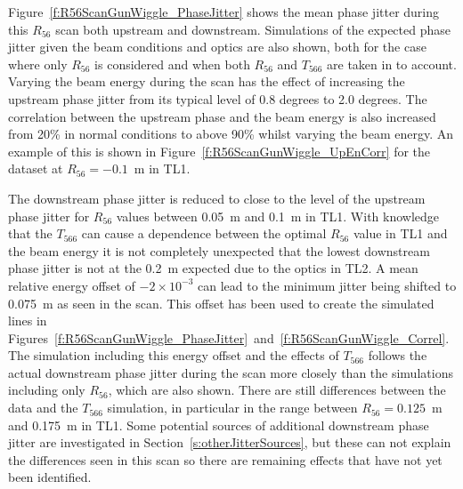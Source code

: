 Figure~\ref{f:R56ScanGunWiggle_PhaseJitter} shows the mean phase jitter during this \(R_{56}\) scan both upstream and downstream. Simulations of the expected phase jitter given the beam conditions and optics are also shown, both for the case where only \(R_{56}\) is considered and when both \(R_{56}\) and \(T_{566}\) are taken in to account. Varying the beam energy during the scan has the effect of increasing the upstream phase jitter from its typical level of 0.8 degrees to 2.0 degrees. The correlation between the upstream phase and the beam energy is also increased from 20\% in normal conditions to above 90\% whilst varying the beam energy. An example of this is shown in Figure~\ref{f:R56ScanGunWiggle_UpEnCorr} for the dataset at \(R_{56}=-0.1\)~m in TL1. %

The downstream phase jitter is reduced to close to the level of the upstream phase jitter for \(R_{56}\) values between 0.05~m and 0.1~m in TL1.  With knowledge that the \(T_{566}\) can cause a dependence between the optimal \(R_{56}\) value in TL1 and the beam energy it is not completely unexpected that the lowest downstream phase jitter is not at the 0.2~m expected due to the optics in TL2. A mean relative energy offset of \(-2\times10^{-3}\) can lead to the minimum jitter being shifted to 0.075~m as seen in the scan. This offset has been used to create the simulated lines  in Figures~\ref{f:R56ScanGunWiggle_PhaseJitter}~and~\ref{f:R56ScanGunWiggle_Correl}. The simulation including this energy offset and the effects of \(T_{566}\) follows the actual downstream phase jitter during the scan more closely than the simulations including only \(R_{56}\), which are also shown. There are still differences between the data and the \(T_{566}\) simulation, in particular in the range between \(R_{56} = 0.125\)~m and 0.175~m in TL1. Some potential sources of additional downstream phase jitter are investigated in Section~\ref{s:otherJitterSources}, but these can not explain the differences seen in this scan so there are remaining effects that have not yet been identified.


